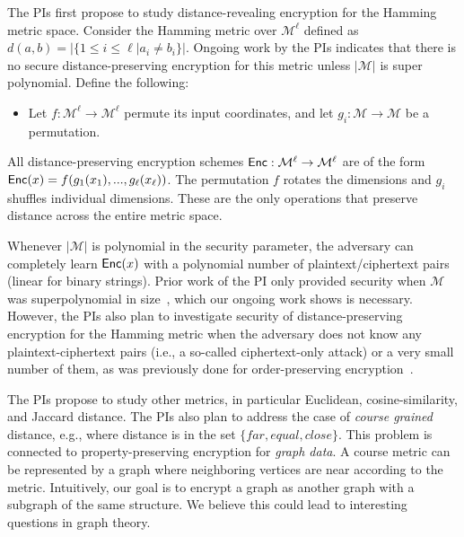 The PIs first propose to study distance-revealing encryption for the Hamming metric space.
Consider the Hamming metric over $\mathcal{M}^\ell$ defined as $d(a,b) = | \{ 1\le i\le \ell | a_i \neq b_i\}|$.  Ongoing work by the PIs indicates that there is no secure distance-preserving encryption for this metric unless $|\mathcal{M}|$ is super polynomial.  Define the following: 
\begin{itemize}\setlength\itemsep{0em}
\item Let $f: \mathcal{M}^\ell \rightarrow \mathcal{M}^\ell$ permute its input coordinates, and let $g_i: \mathcal{M}\rightarrow \mathcal{M}$ be a permutation.
\end{itemize}
All distance-preserving encryption schemes $\mathsf{Enc}: \mathcal{M}^\ell\rightarrow \mathcal{M}^\ell$ are of the form $\mathsf{Enc}(x) = f(g_1(x_1),..., g_\ell(x_\ell))$.  The permutation $f$ rotates the dimensions and $g_i$ shuffles individual dimensions.  These are the only operations that preserve distance across the entire metric space.

Whenever $|\mathcal{M}|$ is polynomial in the security parameter, the adversary can completely learn $\mathsf{Enc}(x)$ with a polynomial number of plaintext/ciphertext pairs (linear for binary strings).  Prior work of the PI only provided security when $\mathcal{M}$ was superpolynomial in size~\cite{EPRINT:ABCFG16}, which our ongoing work shows is necessary.  However, the PIs also plan to investigate security of distance-preserving encryption for the Hamming metric when the adversary does not know any plaintext-ciphertext pairs (i.e., a so-called ciphertext-only attack) or a very small number of them, as was previously done for order-preserving encryption~\cite{C:BolCheONe11}.
 
 The PIs propose to study other metrics, in particular Euclidean,
 cosine-similarity, and Jaccard distance.    The PIs also plan to
 address the case of \emph{course grained} distance, e.g., where
 distance is in the set $\{far, equal, close\}$.  This problem is
 connected to property-preserving encryption for \emph{graph data}.  A
 course metric can be represented by a graph where neighboring vertices
 are near according to the metric.  Intuitively, our goal is to encrypt
 a graph as another graph with a subgraph of the same structure. We believe this could lead to interesting questions in graph theory.

